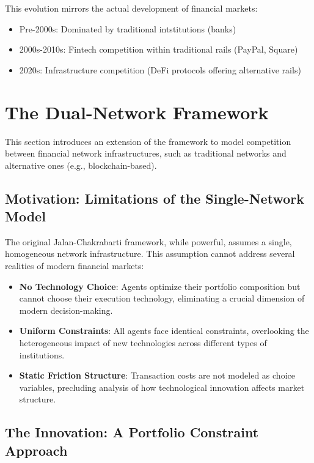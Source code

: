 This evolution mirrors the actual development of financial markets:
\begin{itemize}
    \item Pre-2000s: Dominated by traditional intstitutions (banks)
    \item 2000s-2010s: Fintech competition within traditional rails (PayPal, Square)
    \item 2020s: Infrastructure competition (DeFi protocols offering alternative rails)
\end{itemize}


\section{The Dual-Network Framework}

This section introduces an extension of the  framework to model competition between financial network infrastructures, such as traditional networks and alternative ones (e.g., blockchain-based).

\subsection{Motivation: Limitations of the Single-Network Model}
\label{sec:motivation}

The original Jalan-Chakrabarti framework, while powerful, assumes a single, homogeneous network infrastructure. This assumption cannot address several realities of modern financial markets:

\begin{itemize}
    \item \textbf{No Technology Choice}: Agents optimize their portfolio composition but cannot choose their execution technology, eliminating a crucial dimension of modern decision-making.
    \item \textbf{Uniform Constraints}: All agents face identical constraints, overlooking the heterogeneous impact of new technologies across different types of institutions.
    \item \textbf{Static Friction Structure}: Transaction costs are not modeled as choice variables, precluding analysis of how technological innovation affects market structure.
\end{itemize}

\subsection{The Innovation: A Portfolio Constraint Approach}
\label{sec:core_innovation}

